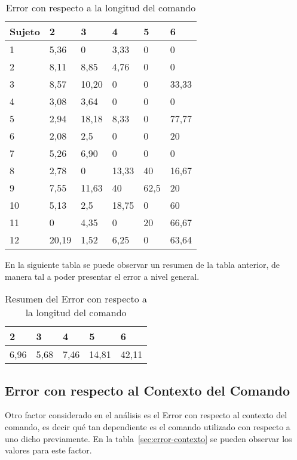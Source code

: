 \begin{table}[H]
\centering
\footnotesize
\begin{tabular}{|p{1.6cm}|p{1.6cm}|p{1.6cm}|p{1.6cm}|p{1.6cm}|p{1.6cm}|}
\hline
    Sujeto & 2 & 3 & 4 & 5 & 6  \\
    \hline 
    1 & 5,36   & 0     & 3,33  &0   &0 \\
    2 & 8,11   & 8,85  & 4,76  &0   &0 \\
    3 & 8,57   & 10,20 & 0 &  0  &33,33 \\
    4 & 3,08   & 3,64 & 0  & 0  & 0 \\
    5 & 2,94   & 18,18 & 8,33 &  0 & 77,77 \\
    6 & 2,08   & 2,5 & 0 & 0 & 20 \\
    7 & 5,26   & 6,90 & 0 & 0 & 0 \\
    8 & 2,78   & 0 & 13,33 & 40 & 16,67 \\
    9 & 7,55   & 11,63 & 40  &  62,5  & 20 \\
    10 & 5,13  & 2,5  & 18,75  &  0 & 60 \\
    11 & 0     & 4,35 & 0 & 20 & 66,67 \\
    12 & 20,19 & 1,52 & 6,25 & 0  & 63,64 \\
\hline
\end{tabular}
\caption{Error con respecto a la longitud del comando}
\label{sec:error-longitud}
\end{table}

En la siguiente tabla se puede observar un resumen de la tabla anterior, de manera tal a poder presentar
el error a nivel general.

\begin{table}[H]
\centering
\footnotesize
\begin{tabular}{|p{1.6cm}|p{1.6cm}|p{1.6cm}|p{1.6cm}|p{1.6cm}|}
\hline
    2 & 3 & 4 & 5 & 6  \\
    \hline 
    6,96 & 5,68 & 7,46 & 14,81 & 42,11 \\
    \hline
\end{tabular}
\caption{Resumen del Error con respecto a la longitud del comando}
\label{sec:error-longitud-resumen}
\end{table}


\subsection{Error con respecto al Contexto del Comando}

Otro factor considerado en el an\'alisis es el Error con respecto al contexto del comando, es decir
qu\'e tan dependiente es el comando utilizado con respecto a uno dicho previamente. En la tabla~\ref{sec:error-contexto}
se pueden observar los valores para este factor.

